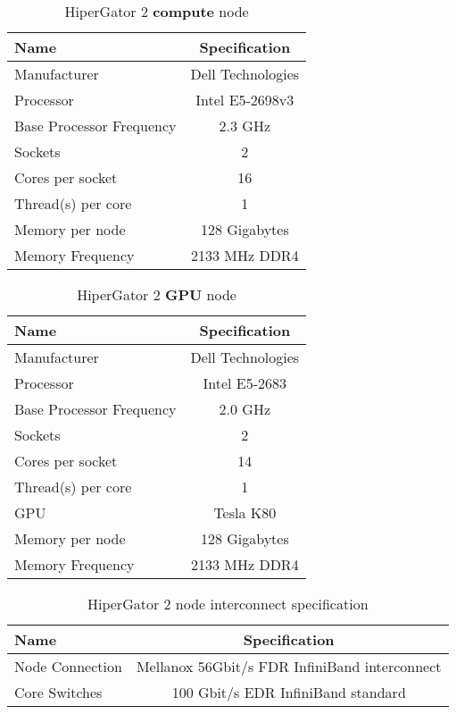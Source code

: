 \begin{table}[h]
  \centering
  \caption{HiperGator 2 \textbf{compute} node}
  \begin{tabular}{l c}
    \hline
    Name                       & Specification     \\
    \hline
    Manufacturer               & Dell Technologies \\
    Processor                  & Intel E5-2698v3   \\
    Base Processor Frequency   & 2.3 GHz           \\
    Sockets                    & 2                 \\
    Cores per socket           & 16                \\
    Thread(s) per core         & 1                 \\
    Memory per node            & 128 Gigabytes     \\
    Memory Frequency           & 2133 MHz DDR4     \\
    \hline
  \end{tabular}
  \label{tab:hpgcomputespecs}
\end{table}

\begin{table}[h]
  \centering
  \caption{HiperGator 2 \textbf{GPU} node}
  \begin{tabular}{l c}
    \hline
    Name                       & Specification     \\
    \hline
    Manufacturer               & Dell Technologies \\
    Processor                  & Intel E5-2683     \\
    Base Processor Frequency   & 2.0 GHz           \\
    Sockets                    & 2                 \\
    Cores per socket           & 14                \\
    Thread(s) per core         & 1                 \\
    GPU                        & Tesla K80         \\
    Memory per node            & 128 Gigabytes     \\
    Memory Frequency           & 2133 MHz DDR4     \\
    \hline
  \end{tabular}
  \label{tab:hpggpuspecs}
\end{table}

\begin{table}[h]
  \centering
  \caption{HiperGator 2 node interconnect specification}
  \begin{tabular}{l c}
    \hline
    Name             & Specification                                 \\
    \hline
    Node Connection  & Mellanox 56Gbit/s FDR InfiniBand interconnect \\
    Core Switches    & 100 Gbit/s EDR InfiniBand standard            \\
    \hline
  \end{tabular}
  \label{tab:hpgconnectspecs}
\end{table}


